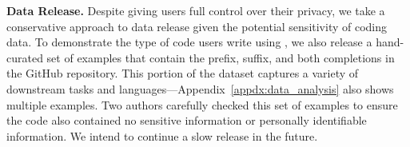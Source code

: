 \textbf{Data Release.} Despite giving users full control over their privacy, we take a conservative approach to data release given the potential sensitivity of coding data.
To demonstrate the type of code users write using \systemName, we also release a hand-curated set of examples that contain the prefix, suffix, and both completions in the GitHub repository.
This portion of the dataset captures a variety of downstream tasks and languages---Appendix~\ref{appdx:data_analysis} also shows multiple examples.
Two authors carefully checked this set of examples to ensure the code also contained no sensitive information or personally identifiable information. 
We intend to continue a slow release in the future.













